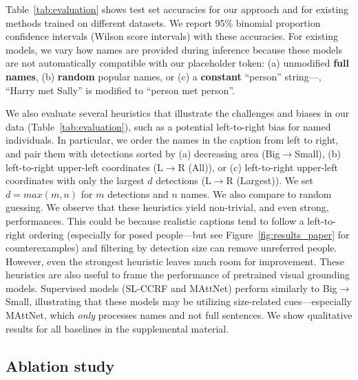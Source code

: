 Table~\ref{tab:evaluation} shows test set accuracies for our approach and for existing methods trained on different datasets. We report 95\% binomial proportion confidence intervals (Wilson score intervals) with these accuracies.
For existing models, we vary how names are provided during inference because these models are not automatically compatible with our placeholder \NAME token: (a) unmodified \textbf{full names}, (b) \textbf{random} popular names, or (c) a \textbf{constant} ``person'' string---\eg, ``Harry met Sally'' is modified to ``person met person''. 

We also evaluate several heuristics that illustrate the challenges and biases in our data (Table~\ref{tab:evaluation}), such as a potential left-to-right bias for named individuals. In particular, we order the names in the caption from left to right, and pair them with detections sorted by (a) decreasing area (Big$\rightarrow$Small), (b) left-to-right upper-left coordinates (L$\rightarrow$R (All)), or (c) left-to-right upper-left coordinates with only the largest $d$ detections (L$\rightarrow$R (Largest)).
We set $d = max(m, n)$ for $m$ detections and $n$ names. We also compare to random guessing.
We observe that these heuristics yield non-trivial, and even strong, performances. This could be because realistic captions tend to follow a left-to-right ordering (especially for posed people---but see Figure~\ref{fig:results_paper} for counterexamples) and filtering by detection size can remove unreferred people.
However, even the strongest heuristic leaves much room for improvement. 
These heuristics are also useful to frame the performance of pretrained visual grounding models. Supervised models (SL-CCRF and MAttNet) perform similarly to Big$\rightarrow$Small, illustrating that these models may be utilizing size-related cues---especially MAttNet, which \emph{only} processes names and not full sentences. We show qualitative results for all baselines in the supplemental material.

\subsection{Ablation study}

